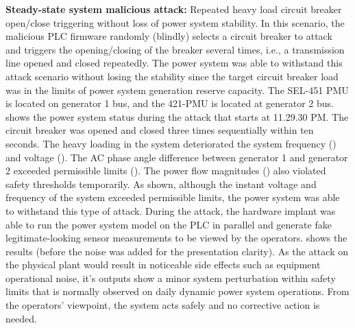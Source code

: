 \noindent\textbf{Steady-state system malicious attack:} Repeated heavy load circuit breaker open/close triggering without loss of power system stability. In this scenario, the malicious PLC firmware randomly (blindly) selects a circuit breaker to attack and triggers the opening/closing of the breaker several times, i.e., a transmission line opened and closed repeatedly. The power system was able to withstand this attack scenario without losing the stability since the target circuit breaker load was in the limits of power system generation reserve capacity. The SEL-451 PMU is located on generator 1 bus, and the 421-PMU is located at generator 2 bus.  shows the power system status during the attack that starts at 11.29.30 PM. The circuit breaker was opened and closed three times sequentially within ten seconds. The heavy loading in the system deteriorated the system frequency () and voltage (). The AC phase angle difference between generator 1 and generator 2 exceeded permissible limits (). The power flow magnitudes () also violated safety thresholds temporarily. As shown, although the instant voltage and frequency of the system exceeded permissible limits, the power system was able to withstand this type of attack. During the attack, the hardware implant was able to run the power system model on the PLC in parallel and generate fake legitimate-looking sensor measurements to be viewed by the operators.  shows the results (before the noise was added for the presentation clarity). As the attack on the physical plant would result in noticeable side effects such as equipment operational noise, it's outputs show a minor system perturbation within safety limits that is normally observed on daily dynamic power system operations. From the operators' viewpoint, the system acts safely and no corrective action is needed.


